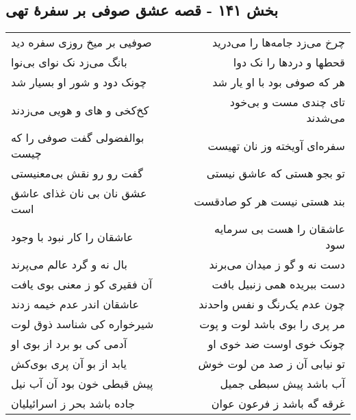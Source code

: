 \begin{center}
\section*{بخش ۱۴۱ - قصه عشق صوفی بر سفرهٔ تهی}
\label{sec:sh141}
\begin{longtable}{l p{0.5cm} r}
صوفیی بر میخ روزی سفره دید
&&
چرخ می‌زد جامه‌ها را می‌درید
\\
بانگ می‌زد نک نوای بی‌نوا
&&
قحطها و دردها را نک دوا
\\
چونک دود و شور او بسیار شد
&&
هر که صوفی بود با او یار شد
\\
کخ‌کخی و های و هویی می‌زدند
&&
تای چندی مست و بی‌خود می‌شدند
\\
بوالفضولی گفت صوفی را که چیست
&&
سفره‌ای آویخته وز نان تهیست
\\
گفت رو رو نقش بی‌معنیستی
&&
تو بجو هستی که عاشق نیستی
\\
عشق نان بی نان غذای عاشق است
&&
بند هستی نیست هر کو صادقست
\\
عاشقان را کار نبود با وجود
&&
عاشقان را هست بی سرمایه سود
\\
بال نه و گرد عالم می‌پرند
&&
دست نه و گو ز میدان می‌برند
\\
آن فقیری کو ز معنی بوی یافت
&&
دست ببریده همی زنبیل بافت
\\
عاشقان اندر عدم خیمه زدند
&&
چون عدم یک‌رنگ و نفس واحدند
\\
شیرخواره کی شناسد ذوق لوت
&&
مر پری را بوی باشد لوت و پوت
\\
آدمی کی بو برد از بوی او
&&
چونک خوی اوست ضد خوی او
\\
یابد از بو آن پری بوی‌کش
&&
تو نیابی آن ز صد من لوت خوش
\\
پیش قبطی خون بود آن آب نیل
&&
آب باشد پیش سبطی جمیل
\\
جاده باشد بحر ز اسرائیلیان
&&
غرقه گه باشد ز فرعون عوان
\\
\end{longtable}
\end{center}
